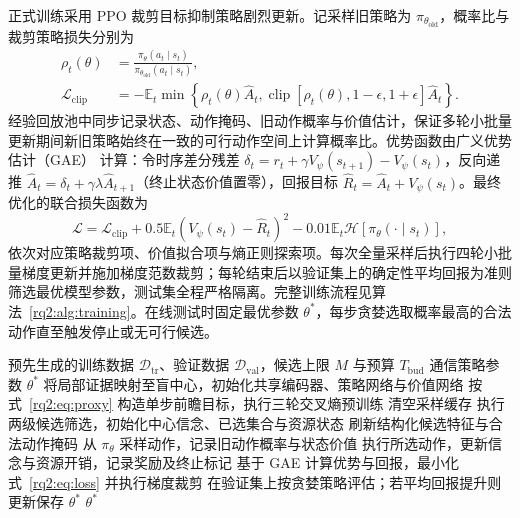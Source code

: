 正式训练采用 PPO 裁剪目标抑制策略剧烈更新\cite{ppo}。记采样旧策略为 $\pi_{\theta_{\mathrm{old}}}$，概率比与裁剪策略损失分别为
\begin{equation}
\begin{aligned}
\rho_t(\theta)&=\frac{\pi_\theta(a_t\mid s_t)}{\pi_{\theta_{\mathrm{old}}}(a_t\mid s_t)},\\
\mathcal L_{\mathrm{clip}}&=
-\mathbb E_t\min\left\{\rho_t(\theta)\widehat A_t,
\operatorname{clip}[\rho_t(\theta),1-\epsilon,1+\epsilon]\widehat A_t\right\}.
\end{aligned}
\label{rq2:eq:ppo}
\end{equation}
经验回放池中同步记录状态、动作掩码、旧动作概率与价值估计，保证多轮小批量更新期间新旧策略始终在一致的可行动作空间上计算概率比。优势函数由广义优势估计（GAE）\cite{gae} 计算：令时序差分残差 $\delta_t=r_t+\gamma V_\psi(s_{t+1})-V_\psi(s_t)$，反向递推 $\widehat A_t=\delta_t+\gamma\lambda\widehat A_{t+1}$（终止状态价值置零），回报目标 $\widehat R_t=\widehat A_t+V_\psi(s_t)$。最终优化的联合损失函数为
\begin{equation}
\mathcal L=\mathcal L_{\mathrm{clip}}+
0.5\mathbb E_t(V_\psi(s_t)-\widehat R_t)^2
-0.01\mathbb E_t\mathcal H[\pi_\theta(\cdot\mid s_t)],
\label{rq2:eq:loss}
\end{equation}
依次对应策略裁剪项、价值拟合项与熵正则探索项。每次全量采样后执行四轮小批量梯度更新并施加梯度范数裁剪；每轮结束后以验证集上的确定性平均回报为准则筛选最优模型参数，测试集全程严格隔离。完整训练流程见算法~\ref{rq2:alg:training}。在线测试时固定最优参数 $\theta^*$，每步贪婪选取概率最高的合法动作直至触发停止或无可行候选。

\begin{algorithm}[!htb]
\caption{EviComRL 的策略训练过程}
\label{rq2:alg:training}
\fontsize{10.5bp}{13.5bp}\selectfont
\begin{algorithmic}[1]
\setlength{\itemsep}{0pt}
\setlength{\parsep}{0pt}
\Require 预先生成的训练数据 $\mathcal D_{\mathrm{tr}}$、验证数据 $\mathcal D_{\mathrm{val}}$，候选上限 $M$ 与预算 $T_{\mathrm{bud}}$
\Ensure 通信策略参数 $\theta^*$
\State 将局部证据映射至盲中心，初始化共享编码器、策略网络与价值网络
\State 按式~\eqref{rq2:eq:proxy} 构造单步前瞻目标，执行三轮交叉熵预训练
  \State 清空采样缓存
    \State 执行两级候选筛选，初始化中心信念、已选集合与资源状态
      \State 刷新结构化候选特征与合法动作掩码
      \State 从 $\pi_\theta$ 采样动作，记录旧动作概率与状态价值
      \State 执行所选动作，更新信念与资源开销，记录奖励及终止标记
    \EndWhile
  \EndFor
  \State 基于 GAE 计算优势与回报，最小化式~\eqref{rq2:eq:loss} 并执行梯度裁剪
  \State 在验证集上按贪婪策略评估；若平均回报提升则更新保存 $\theta^*$
\EndFor
\State \Return $\theta^*$
\end{algorithmic}
\end{algorithm}

